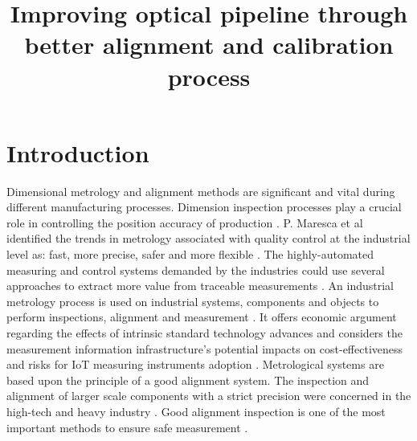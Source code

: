 \documentclass[10pt,a4paper,onecolumn]{article}
\begin{document}
	
	\title{Improving optical pipeline through better alignment and calibration process 
	}

\maketitle

	\section{Introduction}
	\label{intro}
	Dimensional metrology and alignment methods are significant and vital during different manufacturing processes. Dimension inspection processes play a crucial role in controlling the position accuracy of production \cite{gu2020study}. P. Maresca et al identified the trends in metrology associated with quality control at the industrial level as: fast, more precise, safer and more flexible \cite{maresca2019evaluation}. The highly-automated measuring and control systems demanded by the industries could use several approaches to extract more value from traceable measurements \cite{hall2019opportunity}. An industrial metrology process is used on industrial systems, components and objects to perform inspections, alignment and measurement \cite{moru2020machine}. It offers economic argument regarding the effects of intrinsic standard technology advances and considers the measurement information infrastructure's potential impacts on cost-effectiveness and risks for IoT measuring instruments adoption \cite{kuster2020measurement}. Metrological systems are based upon the principle of a good alignment system. The inspection and alignment of larger scale components with a strict precision were concerned in the high-tech and heavy industry \cite{gu2020study}. Good alignment inspection is one of the most important methods to ensure safe measurement \cite{peng2020inertial}.
	
	\newpage
	
	
	
	
\end{document}
